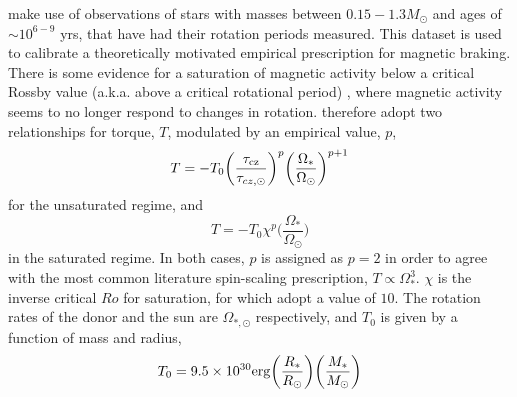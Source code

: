\citet{matt2015} make use of observations of stars with masses between $0.15 - 1.3 M_\odot$ and ages of $\sim 10^{6-9}$ yrs, that have had their rotation periods measured. This dataset is used to calibrate a theoretically motivated empirical prescription for magnetic braking. There is some evidence for a saturation of magnetic activity below a critical Rossby value (a.k.a. above a critical rotational period) \citep{reiners2009}, where magnetic activity seems to no longer respond to changes in rotation. \citet{matt2015} therefore adopt two relationships for torque, $T$, modulated by an empirical value, $p$,
\begin{equation}
    T = -T_0 \bigg( \frac{\tau_{\rm cz}}{\tau_{cz,\odot}} \bigg)^p \bigg( \frac{\Omega_{*}}{\Omega_{\odot}} \bigg)^{p+1} 
\end{equation}
for the unsaturated regime, and 
\begin{equation}
    T = -T_0 \chi^p \bigg( \frac{\Omega_*}{\Omega_\odot} \bigg)
\end{equation}
in the saturated regime. In both cases, $p$ is assigned as $p = 2$ in order to agree with the most common literature spin-scaling prescription, $T \propto \Omega_*^3$. 
$\chi$ is the inverse critical $Ro$ for saturation, for which \citet{matt2015} adopt a value of $10$.
The rotation rates of the donor and the sun are $\Omega_{*,\odot}$ respectively, and $T_0$ is given by a function of mass and radius,
\begin{equation}
    T_0 = 9.5 \times 10^{30} {\rm erg} \bigg(\frac{R_*}{R_\odot} \bigg) \bigg(\frac{M_*}{M_\odot} \bigg)
\end{equation}

